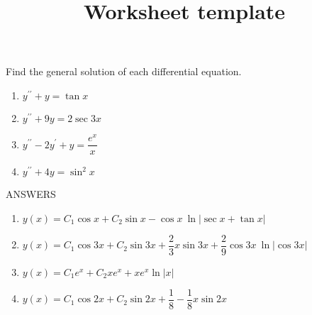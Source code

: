 \documentclass[12pt]{article}
\title{Worksheet template}
\begin{document}
\bigskip
\bigskip

Find the general solution of each differential equation.
\begin{enumerate}

\item
$y^{\prime \prime} + y = \tan x$

\item
$y^{\prime \prime} + 9y = 2 \sec 3x$

\item
$y^{\prime \prime} - 2y^{\prime} + y = \dfrac{e^x}{x}$

\item
$y^{\prime \prime} + 4y = \sin^2 x$

\end{enumerate}

\bigskip

\newpage

ANSWERS

\begin{enumerate}
	\item $y(x) = C_1 \cos x + C_2 \sin x - \cos x \> \ln \lvert \sec x + \tan x \rvert$
	\item $y(x) = C_1 \cos 3x + C_2 \sin 3x + \dfrac{2}{3} x \sin 3x  
    	+ \dfrac{2}{9} \cos 3x \> \ln \rvert \cos 3x \rvert$
	\item $y(x) = C_1 e^x + C_2 x e^x + x e^x \ln \lvert x \rvert$
	\item $y(x) = C_1 \cos 2x + C_2 \sin 2x + \dfrac{1}{8} - \dfrac{1}{8} x \sin 2x$
\end{enumerate}
\end{document}
